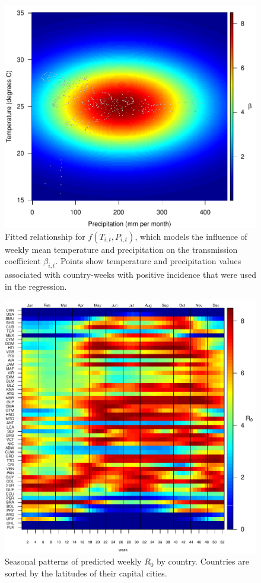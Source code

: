 \documentclass[11pt]{article}
\begin{document}
\newpage
\begin{figure}[!ht]
\begin{center}
\includegraphics{../output/beta_temp_precip.pdf}
\end{center}
\caption{
Fitted relationship for $f(T_{i,t},P_{i,t})$, which models the influence of weekly mean temperature and precipitation on the transmission coefficient $\beta_{i,t}$. Points show temperature and precipitation values associated with country-weeks with positive incidence that were used in the regression.
}
\end{figure}


\newpage
\begin{figure}[!ht]
\begin{center}
\includegraphics{../output/beta_seasonality_abs.pdf}
\end{center}
\caption{
Seasonal patterns of predicted weekly $R_0$ by country. Countries are sorted by the latitudes of their capital cities.
}
\end{figure}
\end{document}
